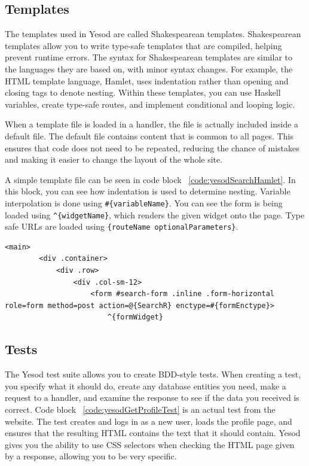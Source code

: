 \subsection{Templates}

The templates used in Yesod are called Shakespearean templates. Shakespearean templates
allow you to write type-safe templates that are compiled, helping prevent runtime errors.
The syntax for Shakespearean templates are similar to the languages they are based on,
with minor syntax changes. For example, the HTML template language, Hamlet,
uses indentation rather than opening and closing tags to denote nesting. Within these
templates, you can use Haskell variables, create type-safe routes, and implement conditional
and looping logic. \parencite[Shakespearean Templates]{yesodBook}

When a template file is loaded in a handler, the file is actually included inside
a default file. The default file contains content that is common to all pages. This
ensures that code does not need to be repeated, reducing the chance of mistakes and
making it easier to change the layout of the whole site.

A simple template file can be seen in code block ~\ref{code:yesodSearchHamlet}. In this
block, you can see how indentation is used to determine nesting. Variable interpolation
is done using \texttt{\#\{variableName\}}. You can see the form is being loaded using
\texttt{\string^\{widgetName\}}, which renders the given widget onto the page. Type safe
URLs are loaded using \texttt{\string@\{routeName optionalParameters\}}.

\begin{lstlisting}[caption={Template file for the search page},label={code:yesodSearchHamlet}]
	<main>
		<div .container>
			<div .row>
				<div .col-sm-12>
					<form #search-form .inline .form-horizontal role=form method=post action=@{SearchR} enctype=#{formEnctype}>
						^{formWidget}

\end{lstlisting}

\subsection{Tests}
The Yesod test suite allows you to create BDD-style tests. When creating a test,
you specify what it should do, create any database entities you need, make a
request to a handler, and examine the response to see if the data you received
is correct. Code block ~\ref{code:yesodGetProfileTest} is an actual test
from the website. The test creates and logs in as a new user, loads
the profile page, and ensures that the resulting HTML contains the text that
it should contain. Yesod gives you the ability to use CSS selectors when checking
the HTML page given by a response, allowing you to be very specific.

